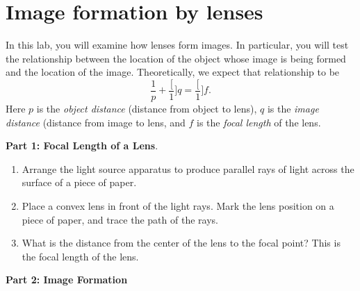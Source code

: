 \section{Image formation by lenses}

\makelabheader

In this lab, you will examine how lenses form images.  In particular,
you will test the relationship between the location of the object
whose image is being formed and the location of the image.  Theoretically,
we expect that relationship to be
$$
{\frac{1} p}+{\frac[1] q}={\frac[1] f}.
$$
Here $p$ is the {\it object distance} (distance from object to lens),
$q$ is the {\it image distance} (distance from image to lens, and $f$
is the {\it focal length} of the lens.

\bigskip

{\bf Part 1: Focal Length of a Lens}.

\begin{enumerate}

\item Arrange the light source apparatus to produce parallel
rays of light across the surface of a piece of paper.
\item Place a convex lens in front of the
light rays.  Mark the lens position on a piece of paper, and trace
the path of the rays.
\item What is the distance from the center of the lens to the focal
point?  This is the focal length of the lens.

\answerspace{1in}

\end{enumerate}

\bigskip

{\bf Part 2: Image Formation}

